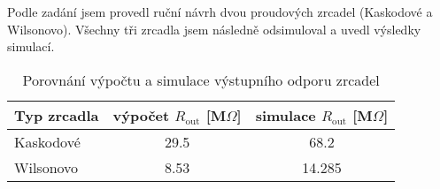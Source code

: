 Podle zadání jsem provedl ruční návrh dvou proudových zrcadel (Kaskodové a Wilsonovo).
Všechny tři zrcadla jsem následně odsimuloval a uvedl výsledky simulací.

\begin{table}[h]
    \centering
    \begin{tabular}{|l|c|c|}
        \hline
        \textbf{Typ zrcadla}    & \textbf{výpočet $R_{\text{out}}$ [M$\Omega$]} & \textbf{simulace $R_{\text{out}}$ [M$\Omega$]} \\ \hline
        Kaskodové               & 29.5                                          & 68.2                                           \\ \hline
        Wilsonovo               & 8.53                                          & 14.285                                         \\ \hline
    \end{tabular}
    \caption{Porovnání výpočtu a simulace výstupního odporu zrcadel}
    \label{tab:zrcadla}
\end{table}